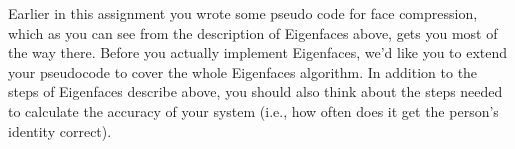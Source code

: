 %

\begin{prob}
Earlier in this assignment you wrote some pseudo code for face compression, which as you can see from the description of Eigenfaces above, gets you most of the way there.  Before you actually implement Eigenfaces, we'd like you to extend your pseudocode to cover the whole Eigenfaces algorithm.  In addition to the steps of Eigenfaces describe above, you should also think about the steps needed to calculate the accuracy of your system (i.e., how often does it get the person's identity correct).
\end{prob}

